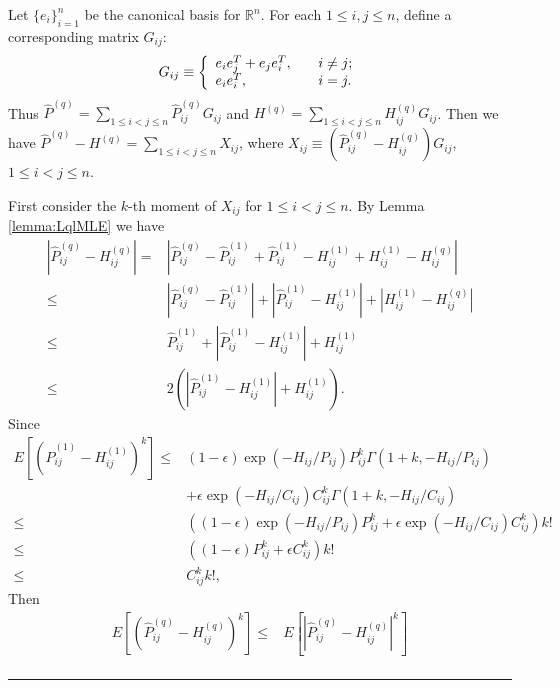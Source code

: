 \documentclass[a4paper]{article}
\newenvironment{proof}{{\bf Proof:  }}{\hfill\rule{2mm}{2mm}}
\begin{document}
\begin{proof}
Let $\{e_i\}_{i=1}^n$ be the canonical basis for $\mathbb{R}^n$. For each $1 \le i, j \le n$, define a corresponding matrix $G_{ij}$:
\[
    G_{ij} \equiv \left\{
    \begin{array}{l l}
        e_i e_j^T + e_j e_i^T, \quad & i \ne j;\\
        e_i e_i^T, \quad & i = j.
    \end{array}
    \right.
\]
Thus $\hat{P}^{(q)} = \sum_{1 \le i < j \le n} \hat{P}^{(q)}_{ij} G_{ij}$ and $H^{(q)} = \sum_{1 \le i < j \le n} H^{(q)}_{ij} G_{ij}$. Then we have $\hat{P}^{(q)} - H^{(q)} = \sum_{1 \le i < j \le n} X_{ij}$, where $X_{ij} \equiv \left( \hat{P}^{(q)}_{ij} - H^{(q)}_{ij} \right) G_{ij}$, $1 \le i < j \le n$.

First consider the $k$-th moment of $X_{ij}$ for $1 \le i < j \le n$. By Lemma \ref{lemma:LqlMLE} we have
\begin{align*}
	\left| \hat{P}^{(q)}_{ij} - H^{(q)}_{ij} \right|
    = & \left| \hat{P}^{(q)}_{ij} - \hat{P}^{(1)}_{ij} + \hat{P}^{(1)}_{ij} - H^{(1)}_{ij} + H^{(1)}_{ij} - H^{(q)}_{ij} \right| \\
    \le & \left| \hat{P}^{(q)}_{ij} - \hat{P}^{(1)}_{ij} \right| + \left| \hat{P}^{(1)}_{ij} - H^{(1)}_{ij} \right| + \left| H^{(1)}_{ij} - H^{(q)}_{ij} \right| \\
    \le & \hat{P}^{(1)}_{ij} + \left| \hat{P}^{(1)}_{ij} - H^{(1)}_{ij} \right| +  H^{(1)}_{ij} \\
    \le & 2 \left( \left| \hat{P}^{(1)}_{ij} - H^{(1)}_{ij} \right| + H^{(1)}_{ij} \right).
\end{align*}
Since
\begin{align*}
	E[(\hat{P}^{(1)}_{ij} - H^{(1)}_{ij})^k]
    \le & (1-\epsilon) \exp(-H_{ij}/P_{ij}) P_{ij}^k \Gamma(1+k, -H_{ij}/P_{ij}) \\
    & + \epsilon \exp(-H_{ij}/C_{ij}) C_{ij}^k \Gamma(1+k, -H_{ij}/C_{ij}) \\
    \le & \left( (1-\epsilon) \exp(-H_{ij}/P_{ij}) P_{ij}^k + \epsilon \exp(-H_{ij}/C_{ij}) C_{ij}^k \right) k! \\
    \le & \left( (1-\epsilon) P_{ij}^k + \epsilon C_{ij}^k \right) k! \\
    \le & C_{ij}^k k!,
\end{align*}
Then
\begin{align*}
	E[(\hat{P}^{(q)}_{ij} - H^{(q)}_{ij})^k]
    \le & E\left[\left|\hat{P}^{(q)}_{ij} - H^{(q)}_{ij}\right|^k\right] \\

\end{align*}
\end{proof}
\end{document}
